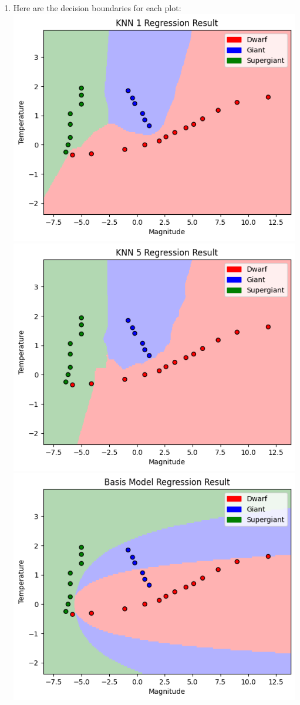 \documentclass[submit]{harvardml}
\newenvironment{ans}{
  \begin{enumerate}
  \color{blue}
}{
  \end{enumerate}
  \color{black}
}
\begin{document}
\newpage
\begin{ans}
    \item Here are the decision boundaries for each plot:
    \newline
    \includegraphics[scale=0.5]{hw2/knn1.png}
    \includegraphics[scale=0.5]{hw2/knn5.png}
    \newline
    \includegraphics[scale=0.5]{hw2/phi.png}

\end{ans}
\end{document}
